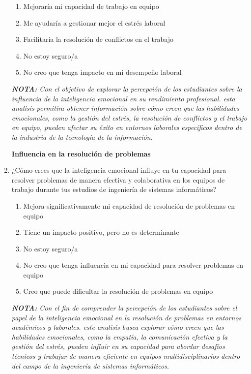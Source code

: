 \documentclass[journal]{IEEEtran}
\begin{document}
\begin{enumerate}
	\begin{enumerate}
		\item Mejoraría mi capacidad de trabajo en equipo
		\item Me ayudaría a gestionar mejor el estrés laboral
		\item Facilitaría la resolución de conflictos en el trabajo
		\item No estoy seguro/a
		\item No creo que tenga impacto en mi desempeño laboral
	\end{enumerate}
	\textit{\textbf{NOTA:} Con el objetivo de explorar la percepción de los estudiantes sobre la influencia de la inteligencia emocional en su rendimiento profesional. esta analisis permitira obtener información sobre cómo creen que las habilidades emocionales, como la gestión del estrés, la resolución de conflictos y el trabajo en equipo, pueden afectar su éxito en entornos laborales específicos dentro de la industria de la tecnología de la información.}
	\begin{center}
	\textbf{Influencia en la resolución de problemas}
	\end{center}
	\item ¿Cómo crees que la inteligencia emocional influye en tu capacidad para resolver problemas de manera efectiva y colaborativa en los equipos de trabajo durante tus estudios de ingeniería de sistemas informáticos?
	\begin{enumerate}
		\item Mejora significativamente mi capacidad de resolución de problemas en equipo
		\item Tiene un impacto positivo, pero no es determinante
		\item No estoy seguro/a
		\item No creo que tenga influencia en mi capacidad para resolver problemas en equipo
		\item Creo que puede dificultar la resolución de problemas en equipo
	\end{enumerate}
	\textit{\textbf{NOTA:} Con el fin de comprender la percepción de los estudiantes sobre el papel de la inteligencia emocional en la resolución de problemas en entornos académicos y laborales. este analisis busca explorar cómo creen que las habilidades emocionales, como la empatía, la comunicación efectiva y la gestión del estrés, pueden influir en su capacidad para abordar desafíos técnicos y trabajar de manera eficiente en equipos multidisciplinarios dentro del campo de la ingeniería de sistemas informáticos.}

\end{enumerate}
\end{document}
